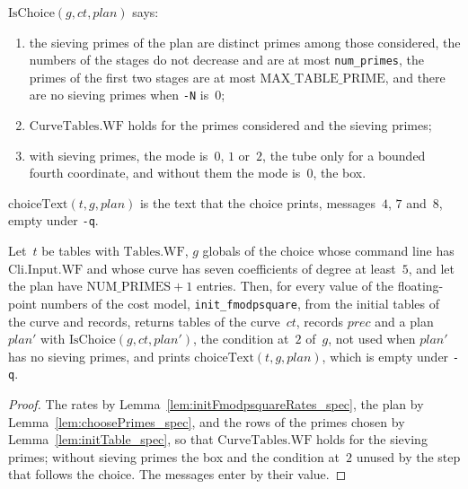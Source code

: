 \begin{definition}\label{def:IsChoice}
  \leanok
  $\mathrm{IsChoice}(g, \mathit{ct}, \mathit{plan})$ says:
  \begin{enumerate}
    \item the sieving primes of the plan are distinct primes among those considered, the numbers of
      the stages do not decrease and are at most \texttt{num\_primes}, the primes of the first two stages
      are at most $\mathrm{MAX\_TABLE\_PRIME}$, and there are no sieving primes when \texttt{-N} is~$0$;
    \item $\mathrm{CurveTables.WF}$ holds for the primes considered and the sieving primes;
    \item with sieving primes, the mode is~$0$, $1$ or~$2$, the tube only for a bounded fourth
      coordinate, and without them the mode is~$0$, the box.
  \end{enumerate}
  $\mathrm{choiceText}(t, g, \mathit{plan})$ is the text that the choice prints, messages~$4$, $7$
  and~$8$, empty under \texttt{-q}.
\end{definition}

\begin{lemma}\label{lem:initFmodpsquare_isChoice}
  \leanok
  Let~$t$ be tables with $\mathrm{Tables.WF}$, $g$ globals of the choice whose command line has
  $\mathrm{Cli.Input.WF}$ and whose curve has seven coefficients of degree at least~$5$, and let the
  plan have $\mathrm{NUM\_PRIMES} + 1$ entries. Then, for every value of the floating-point numbers
  of the cost model, \texttt{init\_fmodpsquare}, from the initial tables of the curve and records,
  returns tables of the curve~$\mathit{ct}$, records $\mathit{prec}$ and a plan $\mathit{plan}'$
  with $\mathrm{IsChoice}(g, \mathit{ct}, \mathit{plan}')$, the condition at~$2$
  of~$g$, not used when $\mathit{plan}'$ has no sieving primes, and prints
  $\mathrm{choiceText}(t, g, \mathit{plan})$, which is empty under \texttt{-q}.
\end{lemma}

\begin{proof}
  \leanok
  The rates by Lemma~\ref{lem:initFmodpsquareRates_spec}, the plan by
  Lemma~\ref{lem:choosePrimes_spec}, and the rows of the primes chosen by
  Lemma~\ref{lem:initTable_spec}, so that $\mathrm{CurveTables.WF}$ holds for the sieving primes;
  without sieving primes the box and the condition at~$2$ unused by the step that follows the
  choice. The messages enter by their value.
\end{proof}

